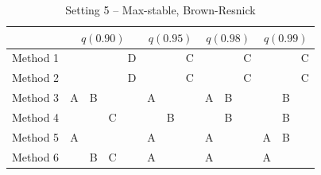 \documentclass[useAMS,usenatbib,referee]{biomweb}
\begin{document}
\begin{table}[htbp]
  \centering
  \caption{Setting 5 -- Max-stable, Brown-Resnick}
  \label{sttbl:transsim}
  \begin{tabular}{|l|cccc|ccc|ccc|ccc|}
    \cline{2-14}
    \multicolumn{1}{c}{} & \multicolumn{4}{|c}{$q(0.90)$} & \multicolumn{3}{|c}{$q(0.95)$} & \multicolumn{3}{|c}{$q(0.98)$} & \multicolumn{3}{|c|}{$q(0.99)$} \\
    \hline
    Method 1 &   &   &   & D &   &   & C &   &   & C &   &   & C \\
    \hline
    Method 2 &   &   &   & D &   &   & C &   &   & C &   &   & C \\
    \hline
    Method 3 & A & B &   &   & A &   &   & A & B &   &   & B &   \\
    \hline
    Method 4 &   &   & C &   &   & B &   &   & B &   &   & B &   \\
    \hline
    Method 5 & A &   &   &   & A &   &   & A &   &   & A & B &   \\
    \hline
    Method 6 &   & B & C &   & A &   &   & A &   &   & A &   &   \\
    \hline
  \end{tabular}
\end{table}



\end{document}
